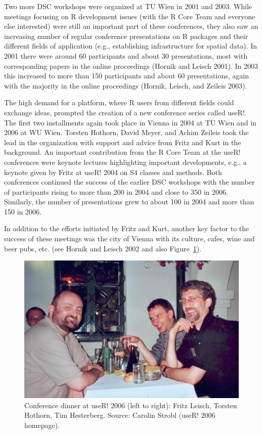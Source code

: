 Two more DSC workshops were organized at TU Wien
in 2001 and 2003. While meetings focusing on R development issues (with the
R Core Team and everyone else interested) were still an important part of
these conferences, they also saw an increasing number of regular conference
presentations on R packages and their different fields of application
(e.g., establishing infrastructure for spatial data). In 2001 there were
around 60 participants and about 30 presentations, most with corresponding
papers in the online proceedings (Hornik and Leisch 2001). In 2003 this
increased to more than 150 participants and about 60 presentations, again
with the majority in the online proceedings (Hornik, Leisch, and Zeileis 2003).

The high demand for a platform, where R users from different fields could
exchange ideas, prompted the creation of a new conference series called
useR!. The first two installments again took place in Vienna in 2004
at TU Wien and in 2006 at WU Wien.
Torsten Hothorn, David Meyer, and Achim Zeileis took the lead in the
organization with support and advice from Fritz and Kurt in the background.
An important contribution from the R Core Team at the useR! conferences
were keynote lectures highlighting important developments, e.g., a keynote
given by Fritz at useR! 2004 on S4 classes and methods. Both conferences
continued the success of the earlier DSC workshops with the number of
participants rising to more than 200 in 2004 and close to 350 in 2006.
Similarly, the number of presentations grew to about 100 in 2004 and more
than 150 in 2006.

In addition to the efforts initiated by Fritz and Kurt, another key factor
to the success of these meetings was the city of Vienna with its culture,
cafes, wine and beer pubs, etc. (see Hornik and Leisch 2002 and also
Figure~\ref{fig:user2006}).

\begin{figure}[t!]

{\centering \includegraphics[width=0.83\linewidth]{fritz_files/figure-latex/user2006-1} 

}

\caption{Conference dinner at useR! 2006 (left to right): Fritz Leisch, Torsten Hothorn, Tim Hesterberg. Source: Carolin Strobl (useR! 2006 homepage).}\label{fig:user2006}
\end{figure}

